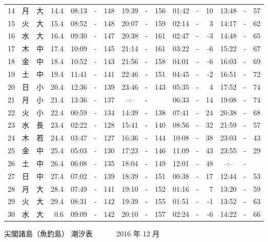 \documentclass[12pt.a4j]{jsarticle}
\begin{document}
\begin{center}
\begin{table}[ht]
\begin{tabular}{|rc|cr|ccrccr|ccrccr|}
14 & 月 & 大 & 14.4 &  08:13 &-& 148  &  19:39 &-& 156  &   01:42 &-&  10  &   13:48 &-&  57  \\
15 & 火 & 大 & 15.4 &  08:52 &-& 148  &  20:07 &-& 159  &   02:14 &-&   3  &   14:17 &-&  62  \\
16 & 水 & 大 & 16.4 &  09:30 &-& 147  &  20:38 &-& 161  &   02:47 &-&  -3  &   14:48 &-&  65  \\
17 & 木 & 中 & 17.4 &  10:09 &-& 145  &  21:14 &-& 161  &   03:22 &-&  -6  &   15:22 &-&  67  \\
18 & 金 & 中 & 18.4 &  10:52 &-& 143  &  21:56 &-& 158  &   04:01 &-&  -6  &   16:03 &-&  69  \\
19 & 土 & 中 & 19.4 &  11:41 &-& 141  &  22:46 &-& 151  &   04:45 &-&  -2  &   16:51 &-&  72  \\
20 & 日 & 小 & 20.4 &  12:36 &-& 139  &  23:46 &-& 143  &   05:35 &-&   4  &   17:52 &-&  74  \\
21 & 月 & 小 & 21.4 &  13:36 &-& 137  &  --:-- &-&     &   06:33 &-&  14  &   19:08 &-&  74  \\
22 & 火 & 小 & 22.4 &  00:59 &-& 134  &  14:39 &-& 138  &   07:41 &-&  24  &   20:38 &-&  68  \\
23 & 水 & 長 & 23.4 &  02:22 &-& 128  &  15:41 &-& 140  &   08:56 &-&  32  &   21:59 &-&  57  \\
24 & 木 & 若 & 24.4 &  03:47 &-& 127  &  16:36 &-& 144  &   10:08 &-&  38  &   23:03 &-&  43  \\
25 & 金 & 中 & 25.4 &  05:03 &-& 130  &  17:23 &-& 146  &   11:09 &-&  43  &   23:55 &-&  29  \\
26 & 土 & 中 & 26.4 &  06:08 &-& 135  &  18:04 &-& 149  &   12:01 &-&  48  &   --:-- &-&     \\
27 & 日 & 中 & 27.4 &  07:02 &-& 139  &  18:39 &-& 151  &   00:38 &-&  17  &   12:44 &-&  53  \\
28 & 月 & 大 & 28.4 &  07:49 &-& 141  &  19:10 &-& 152  &   01:16 &-&   7  &   13:20 &-&  59  \\
29 & 火 & 大 & 29.4 &  08:31 &-& 142  &  19:39 &-& 155  &   01:51 &-&  -1  &   13:52 &-&  63  \\
30 & 水 & 大 &  0.6 &  09:09 &-& 142  &  20:10 &-& 157  &   02:24 &-&  -6  &   14:22 &-&  66  \\
   \hline
   \end{tabular}
\end{table}
\newpage
 {\LARGE 尖閣諸島（魚釣島）  潮汐表　　　}
 {\large 2016 年 12 月}\\
 \begin{table}[ht]

\end{table}
\end{center}
\end{document}
